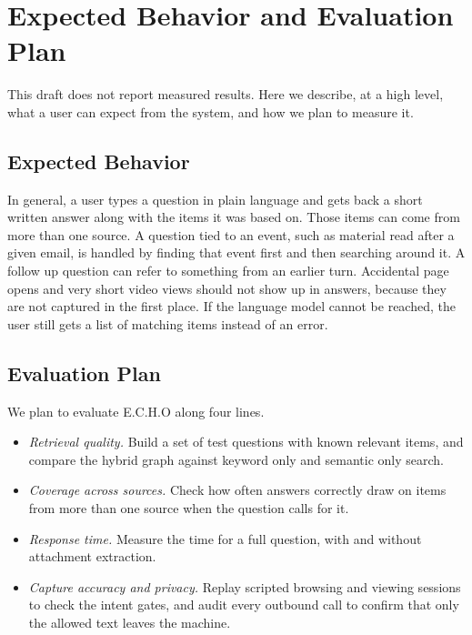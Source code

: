 \documentclass[conference]{IEEEtran}
\begin{document}
\section{Expected Behavior and Evaluation Plan}\label{sec:eval}
This draft does not report measured results. Here we describe, at a high level, what a user can expect from the system, and how we plan to measure it.

\subsection{Expected Behavior}
In general, a user types a question in plain language and gets back a short written answer along with the items it was based on. Those items can come from more than one source. A question tied to an event, such as material read after a given email, is handled by finding that event first and then searching around it. A follow up question can refer to something from an earlier turn. Accidental page opens and very short video views should not show up in answers, because they are not captured in the first place. If the language model cannot be reached, the user still gets a list of matching items instead of an error.

\subsection{Evaluation Plan}
We plan to evaluate E.C.H.O along four lines.
\begin{itemize}
\item \textit{Retrieval quality.} Build a set of test questions with known relevant items, and compare the hybrid graph against keyword only and semantic only search.
\item \textit{Coverage across sources.} Check how often answers correctly draw on items from more than one source when the question calls for it.
\item \textit{Response time.} Measure the time for a full question, with and without attachment extraction.
\item \textit{Capture accuracy and privacy.} Replay scripted browsing and viewing sessions to check the intent gates, and audit every outbound call to confirm that only the allowed text leaves the machine.
\end{itemize}

\end{document}
